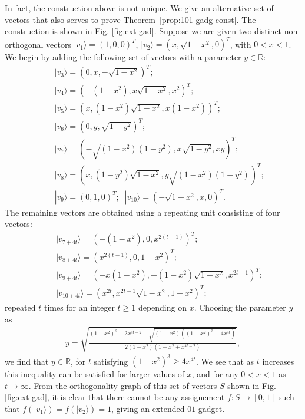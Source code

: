 \documentclass[twocolumn, a4paper, superscriptaddress,nofootinbib, accepted=2020-08-07, hyperref]{quantumarticle}
\begin{document}
In fact, the construction above is not unique. We give an alternative set of vectors that also serves to prove Theorem~\ref{prop:101-gadg-const}. The construction is shown in Fig. \ref{fig:ext-gad}. Suppose we are given two distinct non-orthogonal vectors $|v_1 \rangle = (1,0,0)^T$, $|v_2 \rangle = (x,\sqrt{1-x^2},0)^T$, with $0 < x < 1$. We begin by adding the following set of vectors with a parameter $y \in \mathbb{R}$:
	\begin{eqnarray}
&&|v_3 \rangle = (0,x,-\sqrt{1-x^2})^T; \nonumber \\
&&|v_4 \rangle = (-(1-x^2),x \sqrt{1-x^2},x^2)^T; \nonumber \\
&&|v_5 \rangle = (x,(1-x^2)\sqrt{1-x^2},x(1-x^2))^T; \nonumber \\
&&|v_6 \rangle = (0,y,\sqrt{1-y^2})^T; \nonumber \\
&&|v_7 \rangle = (-\sqrt{(1-x^2)(1-y^2)},x\sqrt{1-y^2}, x y)^T; \nonumber \\
&&|v_8 \rangle = (x,(1-y^2)\sqrt{1-x^2},y\sqrt{(1-x^2)(1-y^2)})^T; \nonumber \\
&&|v_9 \rangle = (0,1,0)^T; \; \; |v_{10} \rangle = (-\sqrt{1-x^2},x,0)^T.
\end{eqnarray}    
The remaining vectors are obtained using a repeating unit consisting of four vectors:
\begin{eqnarray}
&&|v_{7 + 4t} \rangle = (-(1-x^2),0,x^{2(t-1)})^T; \nonumber \\
&&|v_{8 + 4t} \rangle = (x^{2(t-1)},0,1-x^2)^T; \nonumber \\
&&|v_{9+4t} \rangle = (-x(1-x^2),-(1-x^2)\sqrt{1-x^2},x^{2t-1})^T; \nonumber \\
&&|v_{10+4t} \rangle = (x^{2t},x^{2t-1}\sqrt{1-x^2},1-x^2)^T; 
\end{eqnarray}
repeated $t$ times for an integer $t \geq 1$ depending on $x$. Choosing the parameter $y$ as 
\begin{eqnarray}
y = \sqrt{\frac{(1-x^2)^2+2 x^{4t-2} - \sqrt{(1-x^2)((1-x^2)^3 - 4 x^{4t})}}{2(1-x^2)(1-x^2+x^{4t-2})}}, \nonumber
\end{eqnarray}
we find that $y \in \mathbb{R}$, for $t$ satisfying $(1-x^2)^3 \geq 4 x^{4t}$. We see that as $t$ increases this inequality can be satisfied for larger values of $x$, and for any $0 < x < 1$ as $t \rightarrow \infty$. From the orthogonality graph of this set of vectors $S$ shown in Fig. \ref{fig:ext-gad}, it is clear that there cannot be any assignement $f: S \rightarrow [0,1]$ such that $f(|v_1 \rangle)=f(|v_2\rangle)=1$, giving an extended $01$-gadget. 
\end{document}
